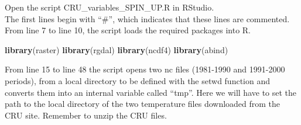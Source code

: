 \documentclass[
  10pt,
  b5paper,
]{book}
\newenvironment{Shaded}{\begin{snugshade}}{\end{snugshade}}
\newcommand{\KeywordTok}[1]{\textcolor[rgb]{0.13,0.29,0.53}{\textbf{#1}}}
\newcommand{\NormalTok}[1]{#1}
\begin{document}
Open the script CRU\_variables\_SPIN\_UP.R in RStudio.\\
The first lines begin with ``\#'', which indicates that these lines are commented. From line 7 to line 10, the script loads the required packages into R.

\begin{Shaded}
\begin{Highlighting}[]
\KeywordTok{library}\NormalTok{(raster)}
\KeywordTok{library}\NormalTok{(rgdal)}
\KeywordTok{library}\NormalTok{(ncdf4)}
\KeywordTok{library}\NormalTok{(abind)}
\end{Highlighting}
\end{Shaded}

From line 15 to line 48 the script opens two nc files (1981-1990 and 1991-2000 periods), from a local directory to be defined with the setwd function and converts them into an internal variable called ``tmp''. Here we will have to set the path to the local directory of the two temperature files downloaded from the CRU site. Remember to unzip the CRU files.
\end{document}
